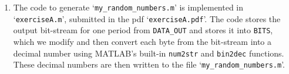 \begin{enumerate}[wide, label=(A\arabic*)]
\item
The code to generate `\texttt{my\_random\_numbers.m}' is implemented in `\texttt{exerciseA.m}', submitted in the pdf `\texttt{exerciseA.pdf}'. The code stores the output bit-stream for one period from \texttt{DATA\_OUT} and stores it into \texttt{BITS}, which we modify and then convert each byte from the bit-stream into a decimal number using MATLAB's built-in \texttt{num2str} and \texttt{bin2dec} functions. These decimal numbers are then written to the file `\texttt{my\_random\_numbers.m}'.


\end{enumerate}
